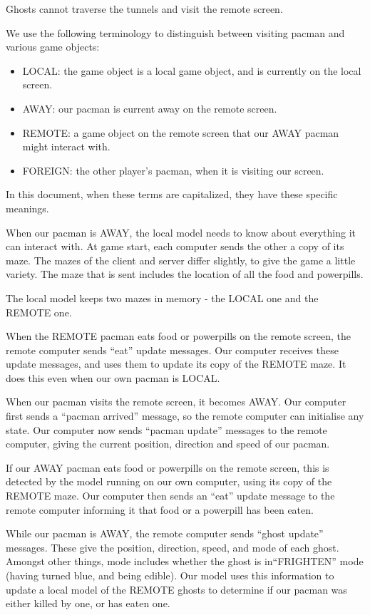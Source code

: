 \documentclass{article}
\begin{document}
Ghosts cannot traverse the tunnels and visit the remote screen.

We use the following terminology to distinguish between visiting pacman and various game objects:
\begin{itemize}
\item{LOCAL}: the game object is a local game object, and is currently on the local screen.
\item{AWAY}: our pacman is current away on the remote screen.
\item{REMOTE}: a game object on the remote screen that our AWAY pacman might interact with.
\item{FOREIGN}: the other player's pacman, when it is visiting our screen.
\end{itemize}
In this document, when these terms are capitalized, they have these
specific meanings.  

When our pacman is AWAY, the local model needs to know about
everything it can interact with.  At game start, each computer sends
the other a copy of its maze.  The mazes of the client and server
differ slightly, to give the game a little variety.  The maze that is
sent includes the location of all the food and powerpills.

The local model keeps two mazes in memory - the LOCAL one and the REMOTE one.

When the REMOTE pacman eats food or powerpills on the remote screen,
the remote computer sends ``eat'' update messages.  Our computer receives these update
messages, and uses them to update its copy of the REMOTE maze.  It
does this even when our own pacman is LOCAL.

When our pacman visits the remote screen, it becomes AWAY.  Our computer first sends a ``pacman arrived'' message, so the remote computer can initialise any state.  Our
computer now sends ``pacman update'' messages to the remote computer, giving the
current position, direction and speed of our pacman.

If our AWAY pacman eats food or powerpills on the remote screen, this
is detected by the model running on our own computer, using its copy
of the REMOTE maze.  Our computer then sends an ``eat'' update message to the
remote computer informing it that food or a powerpill has been eaten.



While our pacman is AWAY, the remote computer sends ``ghost update''
messages.  These give the position, direction, speed, and mode of each
ghost.  Amongst other things, mode includes whether the ghost is
in``FRIGHTEN'' mode (having turned blue, and being edible).  Our model
uses this information to update a local model of the REMOTE ghosts to
determine if our pacman was either killed by one, or has eaten one.
\end{document}
